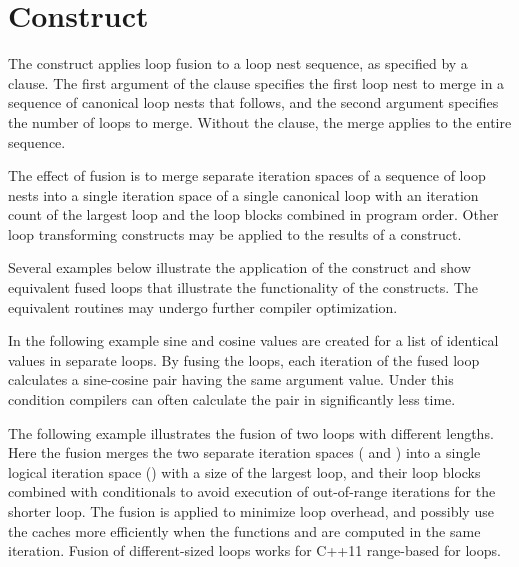 \section{ Construct}
\label{sec:fuse}

The  construct applies loop fusion to a loop nest sequence, as
specified by a  clause. 
The first argument of the  clause specifies the first 
loop nest to merge in a sequence of canonical loop nests that follows,
and the second argument specifies the number of loops to merge.
Without the  clause, the merge applies to the entire sequence.

The effect of fusion is to merge 
separate iteration spaces of a sequence of loop nests
into a single iteration space of a single canonical loop
with an iteration count of the largest loop and the loop blocks
combined in program order. Other loop transforming constructs
may be applied to the results of a  construct.

Several examples below illustrate the application of the  construct
and show equivalent fused loops that illustrate the functionality of the constructs.
The equivalent routines may undergo further compiler optimization.


In the following example sine and cosine values are created for
a list of identical values in separate loops.
By fusing the loops, each iteration of the fused loop calculates
a sine-cosine pair having the same argument value.
Under this condition compilers can often calculate the pair
in significantly less time.



The following example illustrates the fusion of two loops with different lengths.
Here the fusion merges the two
separate iteration spaces ( and ) into a single 
logical iteration space ()
with a size of the largest loop, and their loop blocks
combined with conditionals to avoid 
execution of out-of-range iterations for the shorter loop.
The fusion is applied to minimize loop overhead, and possibly use
the caches more efficiently when the functions  and  
are computed in the same iteration.
Fusion of different-sized loops works for C++11 range-based for loops.

